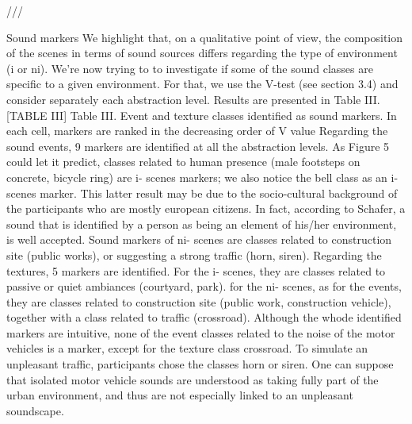 ///

Sound markers We highlight that, on a qualitative point of view, the composition of the scenes in terms of sound sources differs regarding the type of environment (i or ni). We’re now trying to to investigate if some of the sound classes are specific to a given environment. For that, we use the V-test (see section 3.4) and consider separately each abstraction level. Results are presented in Table III.
[TABLE III] Table III. Event and texture classes identified as sound markers. In each cell, markers are ranked in the decreasing order of V value
Regarding the sound events, 9 markers are identified at all the abstraction levels. As Figure 5 could let it predict, classes related to human presence (male footsteps on concrete, bicycle ring) are i- scenes markers; we also notice the bell class as an i- scenes marker. This latter result may be due to the socio-cultural background of the participants who are mostly european citizens. In fact, according to Schafer, a sound that is identified by a person as being an element of his/her environment, is well accepted. Sound markers of ni- scenes are classes related to construction site (public works), or suggesting a strong traffic (horn, siren). Regarding the textures, 5 markers are identified. For the i- scenes, they are classes related to passive or quiet ambiances (courtyard, park). for the ni- scenes, as for the events, they are classes related to construction site (public work, construction vehicle), together with a class related to traffic (crossroad). Although the whode identified markers are intuitive, none of the event classes related to the noise of the motor vehicles is a marker, except for the texture class crossroad. To simulate an unpleasant traffic, participants chose the classes horn or siren. One can suppose that isolated motor vehicle sounds are understood as taking fully part of the urban environment, and thus are not especially linked to an unpleasant soundscape.
